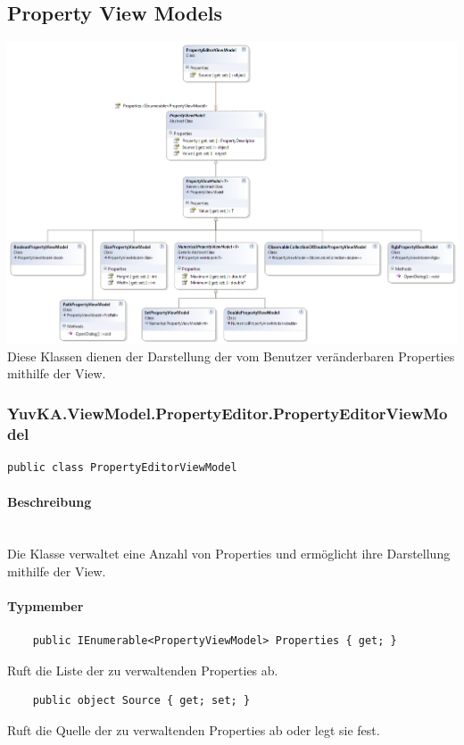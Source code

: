 \subsection{Property View Models}


\includegraphics[width=\textwidth]{YuvKA.ViewModel.PropertyEditor/propertyEditor.png}
Diese Klassen dienen der Darstellung der vom Benutzer veränderbaren Properties mithilfe der View. 



\subsubsection{YuvKA.ViewModel.PropertyEditor.PropertyEditorViewModel}

\begin{verbatim}
public class PropertyEditorViewModel
\end{verbatim}

\paragraph{Beschreibung}~\\
Die Klasse  verwaltet eine Anzahl von Properties und ermöglicht ihre Darstellung mithilfe der View.

\paragraph{Typmember}
\begin{itemize}

	\begin{verbatim}
	public IEnumerable<PropertyViewModel> Properties { get; }
	\end{verbatim}
	Ruft die Liste der zu verwaltenden Properties ab.

	\begin{verbatim}
	public object Source { get; set; }
	\end{verbatim}
	Ruft die Quelle der zu verwaltenden Properties ab oder legt sie fest.

\end{itemize}




